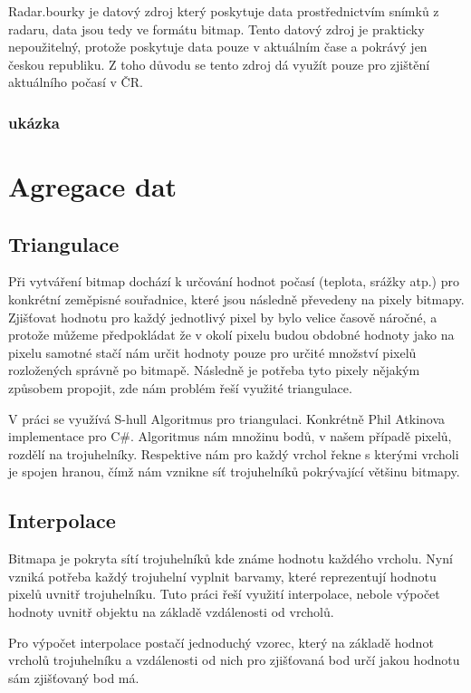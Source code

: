 \documentclass[czech,bachelor,dept460,male,csharp,cpdeclaration]{diploma}
\begin{document}
	Radar.bourky je datový zdroj který poskytuje data prostřednictvím snímků z radaru, data jsou tedy ve formátu bitmap. Tento datový zdroj je prakticky nepoužitelný, protože poskytuje data pouze v aktuálním čase a pokrávý jen českou republiku. Z toho důvodu se tento zdroj dá využít pouze pro zjištění aktuálního počasí v ČR.
	
	\subsubsection{ukázka}
	
	\section{Agregace dat}
	
	\subsection{Triangulace}
	
	Při vytváření bitmap dochází k určování hodnot počasí (teplota, srážky atp.) pro konkrétní zeměpisné souřadnice, které jsou následně převedeny na pixely bitmapy. Zjišťovat hodnotu pro každý jednotlivý pixel by bylo velice časově náročné, a protože můžeme předpokládat že v okolí pixelu budou obdobné hodnoty jako na pixelu samotné stačí nám určit hodnoty pouze pro určité množství pixelů rozložených správně po bitmapě. Následně je potřeba tyto pixely nějakým způsobem propojit, zde nám problém řeší využité triangulace.
	
	V práci se využívá S-hull Algoritmus pro triangulaci. Konkrétně Phil Atkinova implementace pro C\#. Algoritmus nám množinu bodů, v našem případě pixelů, rozdělí na trojuhelníky. Respektive nám pro každý vrchol řekne s kterými vrcholi je spojen hranou, čímž nám vznikne síť trojuhelníků pokrývající většinu bitmapy.
	
	\subsection{Interpolace}
	
	Bitmapa je pokryta sítí trojuhelníků kde známe hodnotu každého vrcholu. Nyní vzniká potřeba každý trojuhelní vyplnit barvamy, které reprezentují hodnotu pixelů uvnitř trojuhelníku. Tuto práci řeší využití interpolace, nebole výpočet hodnoty uvnitř objektu na základě vzdálenosti od vrcholů.
	
	Pro výpočet interpolace postačí jednoduchý vzorec, který na základě hodnot vrcholů trojuhelníku a vzdálenosti od nich pro zjišťovaná bod určí jakou hodnotu sám zjišťovaný bod má.
	
\end{document}
